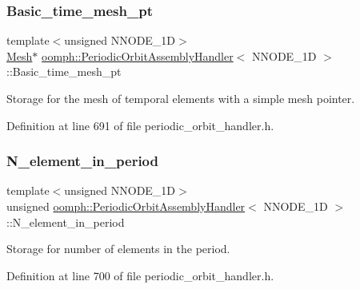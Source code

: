 \subsubsection{\texorpdfstring{Basic\+\_\+time\+\_\+mesh\+\_\+pt}{Basic\_time\_mesh\_pt}}
{\footnotesize\ttfamily template$<$unsigned N\+N\+O\+D\+E\+\_\+1D$>$ \\
\hyperlink{classoomph_1_1Mesh}{Mesh}$\ast$ \hyperlink{classoomph_1_1PeriodicOrbitAssemblyHandler}{oomph\+::\+Periodic\+Orbit\+Assembly\+Handler}$<$ N\+N\+O\+D\+E\+\_\+1D $>$\+::Basic\+\_\+time\+\_\+mesh\+\_\+pt\hspace{0.3cm}{\ttfamily [private]}}



Storage for the mesh of temporal elements with a simple mesh pointer. 



Definition at line 691 of file periodic\+\_\+orbit\+\_\+handler.\+h.

\mbox{\label{classoomph_1_1PeriodicOrbitAssemblyHandler_a52b49ec4c94b9cf480395c7cad123ced}} 
\subsubsection{\texorpdfstring{N\+\_\+element\+\_\+in\+\_\+period}{N\_element\_in\_period}}
{\footnotesize\ttfamily template$<$unsigned N\+N\+O\+D\+E\+\_\+1D$>$ \\
unsigned \hyperlink{classoomph_1_1PeriodicOrbitAssemblyHandler}{oomph\+::\+Periodic\+Orbit\+Assembly\+Handler}$<$ N\+N\+O\+D\+E\+\_\+1D $>$\+::N\+\_\+element\+\_\+in\+\_\+period\hspace{0.3cm}{\ttfamily [private]}}



Storage for number of elements in the period. 



Definition at line 700 of file periodic\+\_\+orbit\+\_\+handler.\+h.

\mbox{\label{classoomph_1_1PeriodicOrbitAssemblyHandler_ada223550212a4e5e5b6838f96e5a2170}} 
